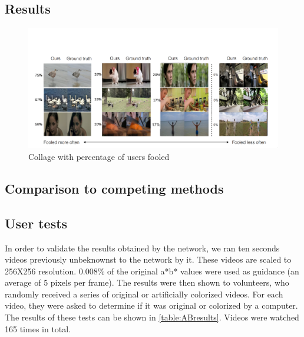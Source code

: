 \documentclass[12pt,openright,twoside,a4paper,english]{abntex2}
\begin{document}
\begin{otherlanguage}{english}

\chapter{Results}

\begin{figure}[!htb]
\centering
\includegraphics[width=\textwidth+20pt]{fool_collage}
\caption{Collage with percentage of users fooled}
\label{fool_collage}
\end{figure}

\section{Comparison to competing methods}


\section{User tests}
In order to validate the results obtained by the network, we ran ten seconds videos previously unbeknownst to the network by it. These videos are scaled to 256X256 resolution. 0.008\% of the original a*b* values were used as guidance (an average of 5 pixels per frame). The results were then shown to volunteers, who randomly received a series of original or artificially colorized videos. For each video, they were asked to determine if it was original or colorized by a computer. The results of these tests can be shown in \ref{table:ABresults}. Videos were watched 165 times in total.


\end{otherlanguage}
\end{document}
